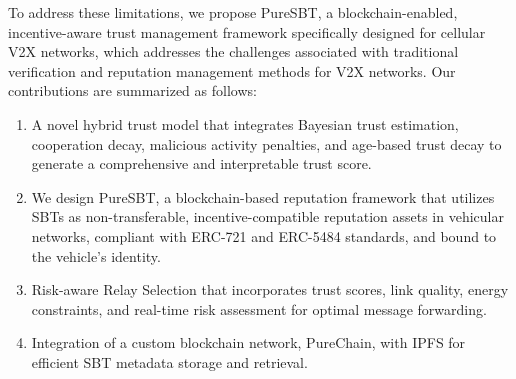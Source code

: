 \cite{cho2010survey}\documentclass[journal,comsoc,twoside]{IEEEtran}
\begin{document}
To address these limitations, we propose PureSBT, a blockchain-enabled, incentive-aware trust management framework specifically designed for cellular V2X networks, which addresses the challenges associated with traditional verification and reputation management methods for V2X networks. Our contributions are summarized as follows:
\begin{enumerate}
    \item A novel hybrid trust model that integrates Bayesian trust estimation, cooperation decay, malicious activity penalties, and age-based trust decay to generate a comprehensive and interpretable trust score.
    \item We design PureSBT, a blockchain-based reputation framework that utilizes SBTs as non-transferable, incentive-compatible reputation assets in vehicular networks, compliant with ERC-721 and ERC-5484 standards, and bound to the vehicle's identity.
    \item  Risk-aware Relay Selection that incorporates trust scores, link quality, energy constraints, and real-time risk assessment for optimal message forwarding.
    \item Integration of a custom blockchain network, PureChain, with IPFS for efficient SBT metadata storage and retrieval.

\end{enumerate}
\end{document}
